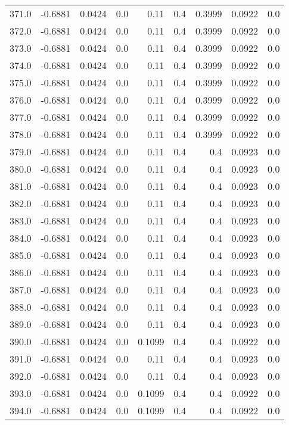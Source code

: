 \begin{longtable}{lrrrrrrrr}
371.0 & -0.6881 & 0.0424 & 0.0 & 0.11 & 0.4 & 0.3999 & 0.0922 & 0.0 \\
372.0 & -0.6881 & 0.0424 & 0.0 & 0.11 & 0.4 & 0.3999 & 0.0922 & 0.0 \\
373.0 & -0.6881 & 0.0424 & 0.0 & 0.11 & 0.4 & 0.3999 & 0.0922 & 0.0 \\
374.0 & -0.6881 & 0.0424 & 0.0 & 0.11 & 0.4 & 0.3999 & 0.0922 & 0.0 \\
375.0 & -0.6881 & 0.0424 & 0.0 & 0.11 & 0.4 & 0.3999 & 0.0922 & 0.0 \\
376.0 & -0.6881 & 0.0424 & 0.0 & 0.11 & 0.4 & 0.3999 & 0.0922 & 0.0 \\
377.0 & -0.6881 & 0.0424 & 0.0 & 0.11 & 0.4 & 0.3999 & 0.0922 & 0.0 \\
378.0 & -0.6881 & 0.0424 & 0.0 & 0.11 & 0.4 & 0.3999 & 0.0922 & 0.0 \\
379.0 & -0.6881 & 0.0424 & 0.0 & 0.11 & 0.4 & 0.4 & 0.0923 & 0.0 \\
380.0 & -0.6881 & 0.0424 & 0.0 & 0.11 & 0.4 & 0.4 & 0.0923 & 0.0 \\
381.0 & -0.6881 & 0.0424 & 0.0 & 0.11 & 0.4 & 0.4 & 0.0923 & 0.0 \\
382.0 & -0.6881 & 0.0424 & 0.0 & 0.11 & 0.4 & 0.4 & 0.0923 & 0.0 \\
383.0 & -0.6881 & 0.0424 & 0.0 & 0.11 & 0.4 & 0.4 & 0.0923 & 0.0 \\
384.0 & -0.6881 & 0.0424 & 0.0 & 0.11 & 0.4 & 0.4 & 0.0923 & 0.0 \\
385.0 & -0.6881 & 0.0424 & 0.0 & 0.11 & 0.4 & 0.4 & 0.0923 & 0.0 \\
386.0 & -0.6881 & 0.0424 & 0.0 & 0.11 & 0.4 & 0.4 & 0.0923 & 0.0 \\
387.0 & -0.6881 & 0.0424 & 0.0 & 0.11 & 0.4 & 0.4 & 0.0923 & 0.0 \\
388.0 & -0.6881 & 0.0424 & 0.0 & 0.11 & 0.4 & 0.4 & 0.0923 & 0.0 \\
389.0 & -0.6881 & 0.0424 & 0.0 & 0.11 & 0.4 & 0.4 & 0.0923 & 0.0 \\
390.0 & -0.6881 & 0.0424 & 0.0 & 0.1099 & 0.4 & 0.4 & 0.0922 & 0.0 \\
391.0 & -0.6881 & 0.0424 & 0.0 & 0.11 & 0.4 & 0.4 & 0.0923 & 0.0 \\
392.0 & -0.6881 & 0.0424 & 0.0 & 0.11 & 0.4 & 0.4 & 0.0923 & 0.0 \\
393.0 & -0.6881 & 0.0424 & 0.0 & 0.1099 & 0.4 & 0.4 & 0.0922 & 0.0 \\
394.0 & -0.6881 & 0.0424 & 0.0 & 0.1099 & 0.4 & 0.4 & 0.0922 & 0.0 \\

\end{longtable}
